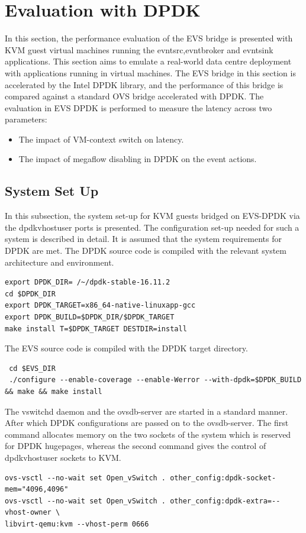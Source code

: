 \section{Evaluation with DPDK}
In this section, the performance evaluation of the EVS bridge is presented with KVM guest virtual machines running the evntsrc,evntbroker and evntsink applications. This section aims to emulate a real-world data centre deployment with applications running in virtual machines. The EVS bridge in this section is accelerated by the Intel DPDK library, and the performance of this bridge is compared against a standard OVS bridge accelerated with DPDK. The evaluation in EVS DPDK is performed to measure the latency across two parameters:
\begin{itemize}
 \item The impact of VM-context switch on latency. 
 \item The impact of megaflow disabling in DPDK on the event actions.
\end{itemize}


\subsection{System Set Up}
In this subsection, the system set-up for KVM guests bridged on EVS-DPDK via the dpdkvhostuser ports is presented. The configuration set-up needed for such a system is described in detail. It is assumed that the system requirements for DPDK are met.\newline
The DPDK source code is compiled with the relevant system architecture and environment. 

\begin{lstlisting}
export DPDK_DIR= /~/dpdk-stable-16.11.2
cd $DPDK_DIR
export DPDK_TARGET=x86_64-native-linuxapp-gcc
export DPDK_BUILD=$DPDK_DIR/$DPDK_TARGET
make install T=$DPDK_TARGET DESTDIR=install
\end{lstlisting}

The EVS source code is compiled with the DPDK target directory.
 \begin{lstlisting}
 cd $EVS_DIR
 ./configure --enable-coverage --enable-Werror --with-dpdk=$DPDK_BUILD && make && make install
 \end{lstlisting}

The vswitchd daemon and the ovsdb-server are started in a standard manner. After which DPDK configurations are passed on to the ovsdb-server. The first command allocates memory on the two sockets of the system which is reserved for DPDK hugepages, whereas the second command gives the control of dpdkvhostuser sockets to KVM.
\begin{lstlisting}
ovs-vsctl --no-wait set Open_vSwitch . other_config:dpdk-socket-mem="4096,4096"
ovs-vsctl --no-wait set Open_vSwitch . other_config:dpdk-extra=--vhost-owner \
libvirt-qemu:kvm --vhost-perm 0666
\end{lstlisting}

